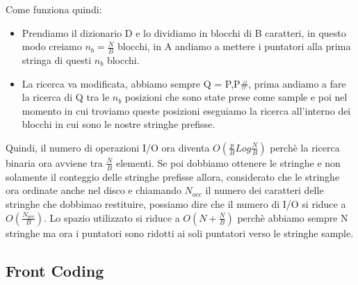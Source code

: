 \documentclass[14pt]{extreport}
\begin{document}
Come funziona quindi:
\begin{itemize}
\item Prendiamo il dizionario D e lo dividiamo in blocchi di B caratteri, in questo modo creiamo $n_b = \frac{N}{B}$ blocchi, in A andiamo a mettere i puntatori alla prima stringa di questi $n_b$ blocchi.
\item La ricerca va modificata, abbiamo sempre Q = {P,P\#}, prima andiamo a fare la ricerca di Q tra le $n_b$ posizioni che sono state prese come sample e poi nel momento in cui troviamo queste posizioni eseguiamo la ricerca all'interno dei blocchi in cui sono le nostre stringhe prefisse.
\end{itemize}

Quindi, il numero di operazioni I/O ora diventa $O(\frac{p}{B}Log\frac{N}{B})$ perchè la ricerca binaria ora avviene tra $\frac{N}{B}$ elementi. Se poi dobbiamo ottenere le stringhe e non solamente il conteggio delle stringhe prefisse allora, considerato che le stringhe ora ordinate anche nel disco e chiamando $N_{occ}$ il numero dei caratteri delle stringhe che dobbimao restituire, possiamo dire che il numero di I/O si riduce a $O(\frac{N_{occ}}{B})$. 
Lo spazio utilizzato si riduce a $O(N+\frac{N}{B})$ perchè abbiamo sempre N stringhe ma ora i puntatori sono ridotti ai soli puntatori verso le stringhe sample.

\subsection{Front Coding}
\end{document}
